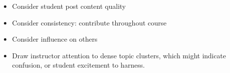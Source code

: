\begin{itemize}
\item Consider student post content quality
\item Consider consistency: contribute throughout course
\item Consider influence on others
\item Draw instructor attention to dense topic clusters, which might
  indicate confusion, or student excitement to harness.
\end{itemize}

